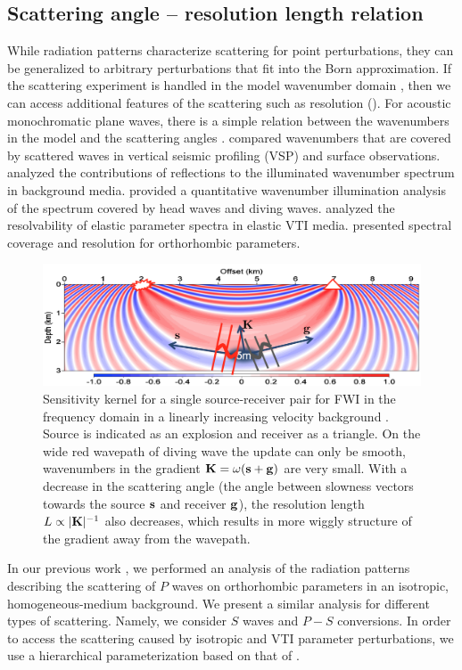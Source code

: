 \subsection{Scattering angle -- resolution length relation}

While radiation patterns characterize scattering for point perturbations, they 
can be generalized to arbitrary perturbations that fit into the Born 
approximation. If the scattering experiment is handled in the model wavenumber domain \citep{devaney1984}, then
we can access additional features of the scattering such as resolution ().
%
For acoustic monochromatic plane waves, there is a simple relation between 
the wavenumbers in the model and the scattering angles \citep{ewald1969,devaney1984}. 
\cite{wu:11} compared wavenumbers that are covered by scattered waves in vertical seismic profiling (VSP) 
and surface observations. \cite{mora1989} analyzed the contributions of reflections to the illuminated wavenumber spectrum in background media. \cite{kazei2013gp} 
provided a quantitative wavenumber illumination analysis of the spectrum covered by head waves and diving waves. \cite{podgornova,podgornova2018} analyzed 
the resolvability of elastic parameter spectra in elastic VTI media. 
\cite{kazei2018} presented spectral coverage and resolution for orthorhombic 
parameters. 
%
\begin{figure}
	\centering
	\includegraphics[width=0.9\linewidth]{Fig/Ksg}
	\caption{Sensitivity kernel for a single source-receiver pair for FWI in the frequency domain in a linearly increasing velocity background \citep{alkhalifah2014scattering,kazei2016}. Source is indicated as an explosion and receiver as a triangle. On the wide red wavepath of diving wave the update can only be smooth, wavenumbers in the gradient  $\mathbf{K} = \omega(\mathbf{s}+\mathbf{g})$ are very small. With a decrease in the scattering angle (the angle between slowness vectors towards the source $\mathbf{s}$ and receiver $\mathbf{g}$), the resolution length $L \propto |\mathbf{K}|^{-1}$ also decreases, which results in more wiggly structure of the gradient away from the wavepath.}
	\label{fig:ksg}
\end{figure}

In our previous work \citep{kazei2018}, we performed an analysis of the 
radiation patterns describing the scattering of $P$ waves on orthorhombic 
parameters in an isotropic, homogeneous-medium background. We present a similar 
analysis for different types of scattering. Namely, we consider $S$ waves and 
$P-S$ conversions. In order to access the scattering caused by isotropic and VTI 
parameter perturbations, we use a hierarchical parameterization based on that of 
\cite{juwon2016, kazei2018}.